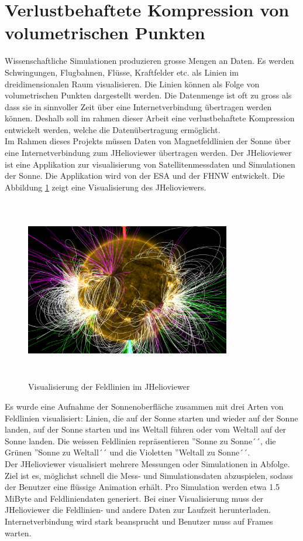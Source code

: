 \section{Verlustbehaftete Kompression von volumetrischen Punkten}
Wissenschaftliche Simulationen produzieren grosse Mengen an Daten. Es werden Schwingungen, Flugbahnen, Flüsse, Kraftfelder etc. als Linien im dreidimensionalen Raum visualisieren. Die Linien können als Folge von volumetrischen Punkten dargestellt werden. Die Datenmenge ist oft zu gross als dass sie in sinnvoller Zeit über eine Internetverbindung übertragen werden können. Deshalb soll im rahmen dieser Arbeit eine verlustbehaftete Kompression entwickelt werden, welche die Datenübertragung ermöglicht.\\
[\baselineskip]
Im Rahmen dieses Projekts müssen Daten von Magnetfeldlinien der Sonne über eine Internetverbindung zum JHelioviewer übertragen werden. Der JHelioviewer ist eine Applikation zur visualisierung von Satellitenmessdaten und Simulationen der Sonne. Die Applikation wird von der ESA und der FHNW entwickelt. Die Abbildung \ref{einleitung::feldlinien} zeigt eine Visualisierung des JHelioviewers.\\
\begin{figure}[!htbp]
\center
	\includegraphics[width=0.8\textwidth,height=8cm,keepaspectratio]{./pictures/einleitung/fieldLines.png}
	\caption{Visualisierung der Feldlinien im JHelioviewer}
	\label{einleitung::feldlinien}
\end{figure}
Es wurde eine Aufnahme der Sonnenoberfläche zusammen mit drei Arten von Feldlinien visualisiert: Linien, die auf der Sonne starten und wieder auf der Sonne landen, auf der Sonne starten und ins Weltall führen oder vom Weltall auf der Sonne landen. Die weissen Feldlinien repräsentieren ''Sonne zu Sonne´´, die Grünen ''Sonne zu Weltall´´ und die Violetten ''Weltall zu Sonne´´.\\
[\baselineskip]
Der JHelioviewer visualisiert mehrere Messungen oder Simulationen in Abfolge. Ziel ist es, möglichst schnell die Mess- und Simulationsdaten abzuspielen, sodass der Benutzer eine flüssige Animation erhält. Pro Simulation werden etwa 1.5 MiByte and Feldliniendaten generiert. Bei einer Visualisierung muss der JHelioviewer die Feldlinien- und andere Daten zur Laufzeit herunterladen.
Internetverbindung wird stark beansprucht und Benutzer muss auf Frames warten.

